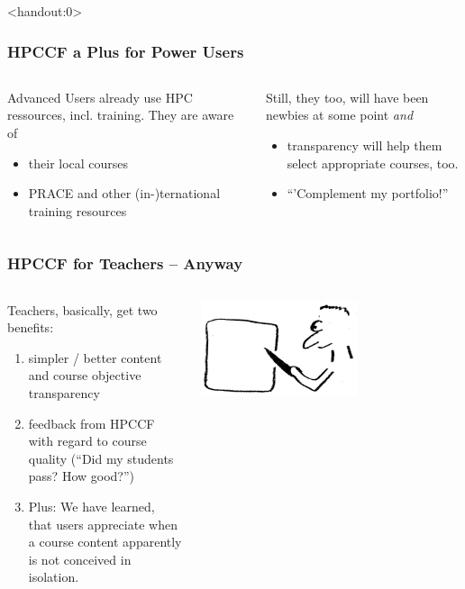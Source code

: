 \begin{frame}<handout:0>
  \frametitle{HPCCF a Plus for Power Users}
  \begin{columns}
    \begin{column}{.5\textwidth}
      Advanced Users already use HPC ressources, incl. training. They are aware of
      \begin{itemize}
       \item their local courses
       \item PRACE and other (in-)ternational training resources
      \end{itemize}
    \end{column}
    \begin{column}{.5\textwidth}
      \pause
      Still, they too, will have been newbies at some point \emph{and}
      \begin{itemize}[<+->]
        \item transparency will help them select appropriate courses, too.
        \item ``'Complement my portfolio!''
      \end{itemize}
    \end{column}
  \end{columns}
\end{frame}

\begin{frame}
  \frametitle{HPCCF for Teachers -- Anyway}
  \begin{columns}
   \begin{column}{.5\textwidth}
    Teachers, basically, get two benefits:
     \begin{enumerate}
      \item simpler / better content and course objective transparency
      \item feedback from HPCCF with regard to course quality (``Did my students pass? How good?'')
      \item Plus: We have learned, that users appreciate when a course content apparently is not conceived in isolation.
     \end{enumerate}
   \end{column}
   \begin{column}{.5\textwidth}
       \centering
      \includegraphics[width=0.6\textwidth]{images/teacher}
    \end{column}
  \end{columns}
\end{frame}


